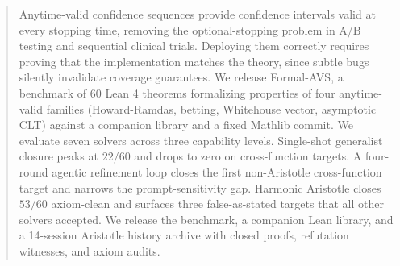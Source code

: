 \begin{abstract}
Anytime-valid confidence sequences provide confidence intervals
valid at every stopping time, removing the optional-stopping
problem in A/B testing and sequential clinical trials. Deploying
them correctly requires proving that the implementation matches
the theory, since subtle bugs silently invalidate coverage
guarantees. We release Formal-AVS, a benchmark of $60$
Lean 4 theorems formalizing properties of four anytime-valid
families (Howard-Ramdas, betting, Whitehouse vector, asymptotic
CLT) against a companion library and a fixed Mathlib commit. We
evaluate seven solvers across three capability levels. Single-shot
generalist closure peaks at $22/60$ and drops to zero on
cross-function targets. A four-round agentic refinement loop
closes the first non-Aristotle cross-function target and narrows
the prompt-sensitivity gap. Harmonic Aristotle closes $53/60$
axiom-clean and surfaces three false-as-stated targets that all
other solvers accepted. We release the benchmark, a companion
Lean library, and a 14-session Aristotle history archive with
closed proofs, refutation witnesses, and axiom audits.
\end{abstract}
